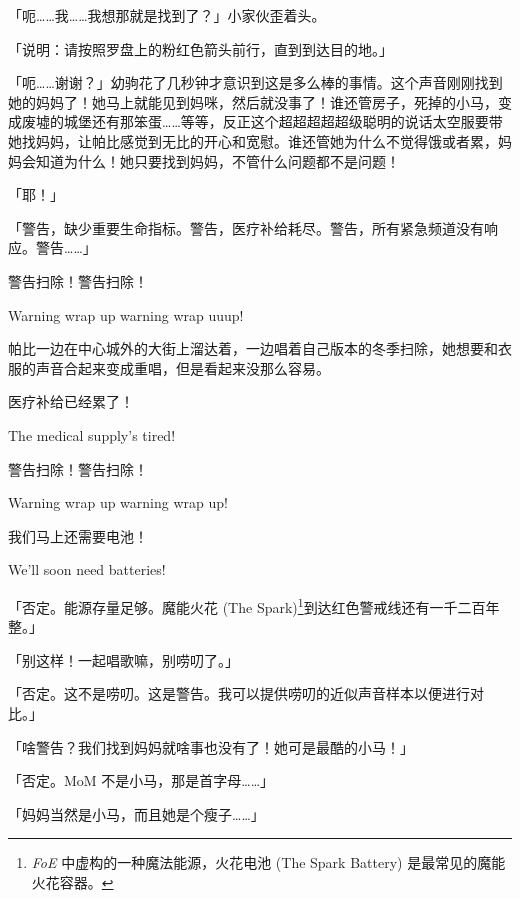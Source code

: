 「呃……我……我想那就是找到了？」小家伙歪着头。

「{\mt 说明：请按照罗盘上的粉红色箭头前行，直到到达目的地。}」

「呃……谢谢？」幼驹花了几秒钟才意识到这是多么棒的事情。这个声音刚刚找到她的妈妈了！她马上就能见到妈咪，然后就没事了！谁还管房子，死掉的小马，变成废墟的城堡还有那笨蛋……等等，反正这个超超超超超级聪明的说话太空服要带她找妈妈，让帕比感觉到无比的开心和宽慰。谁还管她为什么不觉得饿或者累，妈妈会知道为什么！她只要找到妈妈，不管什么问题都不是问题！

「耶！」

\horizonline


「{\mt 警告，缺少重要生命指标。警告，医疗补给耗尽。警告，所有紧急频道没有响应。警告……}」

\begin{song}
警告扫除！警告扫除！

Warning wrap up warning wrap uuup!
\end{song}

帕比一边在中心城外的大街上溜达着，一边唱着自己版本的冬季扫除，她想要和衣服的声音合起来变成重唱，但是看起来没那么容易。

\begin{song}
医疗补给已经累了！

The medical supply's tired!

\medskip

警告扫除！警告扫除！

Warning wrap up warning wrap up!

\medskip

我们马上还需要电池！

We'll soon need batteries!
\end{song}

「{\mt 否定。能源存量足够。魔能火花 (The Spark)\footnote{ \emph{FoE} 中虚构的一种魔法能源，火花电池 (The Spark Battery) 是最常见的魔能火花容器。}到达红色警戒线还有一千二百年整。}」

「别这样！一起唱歌嘛，别唠叨了。」

「{\mt 否定。这不是唠叨。这是警告。我可以提供唠叨的近似声音样本以便进行对比。}」

「啥警告？我们找到妈妈就啥事也没有了！她可是最酷的小马！」

「{\mt 否定。MoM 不是小马，那是首字母……}」

「妈妈当然是小马，而且她是个瘦子……」

